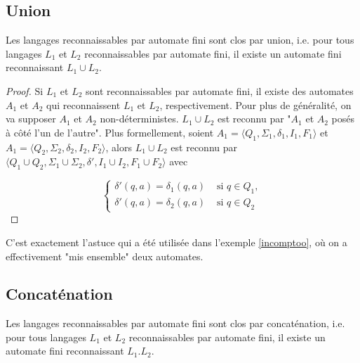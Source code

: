 \subsection{Union}

\begin{theorem}
Les langages reconnaissables par automate fini sont clos par union, i.e. pour tous langages $L_1$ et $L_2$ reconnaissables par automate fini, il existe un automate fini reconnaissant $L_1 \cup L_2$.
\end{theorem}

\begin{proof}

Si $L_1$ et $L_2$ sont reconnaissables par automate fini, il existe des automates $A_1$ et $A_2$ qui reconnaissent $L_1$ et $L_2$, respectivement. Pour plus de généralité, on va supposer $A_1$ et $A_2$ non-déterministes. $L_1 \cup L_2$ est reconnu par "$A_1$ et $A_2$ posés à côté l'un de l'autre". Plus formellement, soient $A_1 = \big \langle Q_1, \Sigma_1, \delta_1, I_1, F_1\big \rangle$ et $A_1 = \big \langle Q_2, \Sigma_2, \delta_2, I_2, F_2\big \rangle$, alors $L_1 \cup L_2$ est reconnu par $\big \langle Q_1 \cup Q_2, \Sigma_1 \cup \Sigma_2, \delta', I_1 \cup I_2, F_1 \cup F_2\big \rangle$ avec 

\[
\begin{cases}
\delta'(q,a) = \delta_1(q,a) &\text{ si } q \in Q_1,\\[1ex]
\delta'(q,a) = \delta_2(q,a) &\text{ si } q \in Q_2\end{cases}
\]

\end{proof}

C'est exactement l'astuce qui a été utilisée dans l'exemple \ref{incomptoo}, où on a effectivement "mis ensemble" deux automates.

\subsection{Concaténation}
\label{clotconcat}
\begin{theorem}
Les langages reconnaissables par automate fini sont clos par concaténation, i.e. pour tous langages $L_1$ et $L_2$ reconnaissables par automate fini, il existe un automate fini reconnaissant $L_1.L_2$.
\end{theorem}

